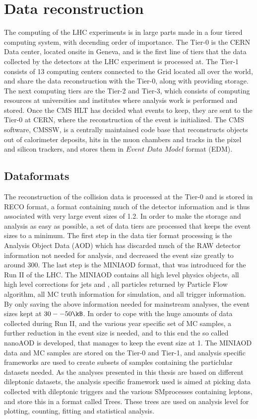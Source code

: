 \section{Data reconstruction}
\noindent
\justify
The computing of the LHC experiments is in large parts made in a four tiered computing system, with decending order of importance. 
The Tier-0 is the CERN Data center, located onsite in Geneva, and is the first line of tiers that the data collected by the detectors at the LHC experiment is processed at. 
The Tier-1 consists of 13 computing centers connected to the Grid located all over the world, and share the data reconstruction with the Tier-0, along with providing storage.
The next computing tiers are the Tier-2 and Tier-3, which consists of computing resources at universities and institutes where analysis work is performed and stored. 
Once the CMS HLT has decided what events to keep, they are sent to the Tier-0 at CERN, where the reconstruction of the event is initialized. 
The CMS software, CMSSW, is a centrally maintained code base that reconstructs objects out of calorimeter deposits, hits in the muon chambers and tracks in the pixel and silicon trackers, and stores them in $Event$ $Data$ $Model$ format (EDM).    
\subsection*{Dataformats}
\noindent
\justify
The reconstruction of the collision data is processed at the Tier-0 and is stored in RECO format, a format containing much of the detector information and is thus associated with very large event sizes of 1.2\MB.
In order to make the storage and analysis as easy as possible, a set of data tiers are processed that keeps the event sizes to a minimum.
The first step in the data tier format processing is the Analysis Object Data (AOD) which has discarded much of the RAW detector information not needed for analysis, and decreased the event size greatly to around 300\kB.
The last step is the MINIAOD format, that was introduced for the Run II of the LHC.
The MINIAOD contains all high level physics objects, all high level corrections for jets and \ptmiss, all particles returned by Particle Flow algorithm, all MC truth information for simulation, and all trigger information.
By only saving the above information needed for mainstream analyses, the event sizes kept at $30--50\kB$.
In order to cope with the huge amounts of data collected during Run II, and the various year specific set of MC samples, a further reduction in the event size is needed, and to this end the so called nanoAOD is developed, that manages to keep the event size at 1\kB.
The MINIAOD data and MC samples are stored on the Tier-0 and Tier-1, and analysis specific frameworks are used to create subsets of samples containing the particlular datasets needed.
As the analyses presented in this thesis are based on different dileptonic datasets, the analysis specific framework used is aimed at picking data collected with dileptonic triggers and the various SMprocesses containing leptons, and store this in a format called Trees.
These trees are used on analysis level for plotting, counting, fitting and statistical analysis.
